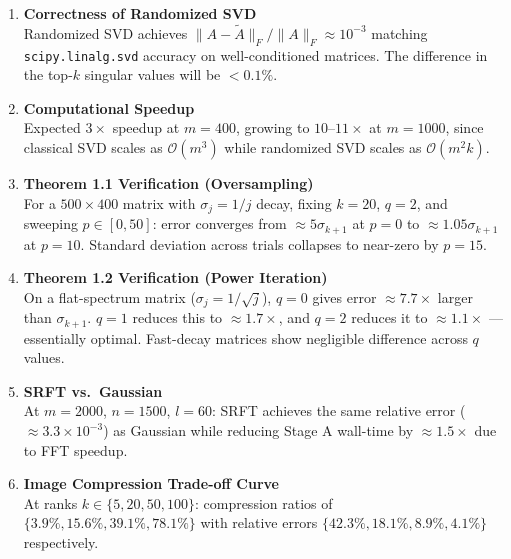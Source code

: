 \documentclass[12pt,a4paper]{article}
\begin{document}
\begin{enumerate}[leftmargin=1.8em, itemsep=4pt]
  \item \textbf{Correctness of Randomized SVD}\\
    Randomized SVD achieves $\|A - \tilde{A}\|_F / \|A\|_F \approx 10^{-3}$ matching
    \texttt{scipy.linalg.svd} accuracy on well-conditioned matrices. The difference
    in the top-$k$ singular values will be $<0.1\%$.

  \item \textbf{Computational Speedup}\\
    Expected $3\times$ speedup at $m=400$, growing to $10$--$11\times$ at $m=1000$,
    since classical SVD scales as $\mathcal{O}(m^3)$ while randomized SVD scales as
    $\mathcal{O}(m^2 k)$.

  \item \textbf{Theorem 1.1 Verification (Oversampling)}\\
    For a $500 \times 400$ matrix with $\sigma_j = 1/j$ decay, fixing $k=20$, $q=2$, and
    sweeping $p \in [0,50]$: error converges from $\approx 5\sigma_{k+1}$ at $p=0$ to
    $\approx 1.05\sigma_{k+1}$ at $p=10$. Standard deviation across trials collapses
    to near-zero by $p=15$.

  \item \textbf{Theorem 1.2 Verification (Power Iteration)}\\
    On a flat-spectrum matrix ($\sigma_j = 1/\sqrt{j}$), $q=0$ gives error $\approx 7.7\times$
    larger than $\sigma_{k+1}$. $q=1$ reduces this to $\approx 1.7\times$, and $q=2$
    reduces it to $\approx 1.1\times$ --- essentially optimal. Fast-decay matrices show
    negligible difference across $q$ values.

  \item \textbf{SRFT vs.\ Gaussian}\\
    At $m=2000$, $n=1500$, $l=60$: SRFT achieves the same relative error ($\approx 3.3 \times 10^{-3}$)
    as Gaussian while reducing Stage A wall-time by $\approx 1.5\times$ due to FFT speedup.

  \item \textbf{Image Compression Trade-off Curve}\\
    At ranks $k \in \{5,20,50,100\}$: compression ratios of $\{3.9\%, 15.6\%, 39.1\%, 78.1\%\}$
    with relative errors $\{42.3\%, 18.1\%, 8.9\%, 4.1\%\}$ respectively.
\end{enumerate}

\end{document}
